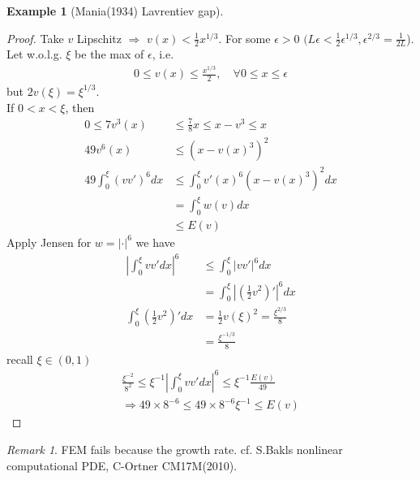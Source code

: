 \documentclass[a4paper,12pt,oneside,fleqn]{book}
\theoremstyle{definition}
\newtheorem*{example}{Example}
\theoremstyle{remark}
\newtheorem*{remark}{Remark}
\begin{document}
\begin{example}[Mania(1934) Lavrentiev gap]
\begin{proof}
	Take $v$ Lipschitz $\Rightarrow$ $v(x) < \frac{1}{2} x^{1\slash 3}$. 
	For some $\epsilon > 0$  $(L\epsilon < \frac{1}{2}\epsilon^{1\slash 3}, \epsilon^{2 \slash 3} = \frac{1}{2L}$). Let w.o.l.g. $\xi$ be the max of $\epsilon$, i.e.
	\begin{align*}
		0 \le v(x) \le \frac{x^{1\slash 3}}{2}, \quad \forall 0 \le x \le \epsilon
	\end{align*}
	but $2v(\xi) = \xi^{1 \slash 3}$. \\
	If $0 < x < \xi$, then 
	\begin{align*}
		0 \le 7 v^3(x) &\le \frac{7}{8} x \le x - v^3 \le x \\
		49 v^6(x) &\le (x - v(x)^3)^2\\
		49 \int_0^\xi (v v')^6 dx &\le \int_0^\xi v'(x)^6 (x - v(x)^3)^2 dx \\
		&= \int_0^\xi w(v)dx \\
		&\le E(v)
	\end{align*}
	Apply Jensen for $w = |\cdot|^6$ we have
	\begin{align*}
		|\int_0^\xi v v'dx|^6 &\le \int_0^\xi |v v'|^6dx\\
		&= \int_0^\xi |(\frac{1}{2} v^2)'|^6dx\\
		\int_0^\xi (\frac{1}{2}v^2)'dx
		&= \frac{1}{2} v(\xi)^2 = \frac{\xi^{2 \slash 3}}{8}\\
		&= \frac{\xi^{-1 \slash 3}}{8}
	\end{align*}
	recall $\xi \in (0, 1)$
	\begin{align*}
		\frac{\xi^{-2}}{8^2} \le \xi^{-1}|\int_0^\xi v v'dx|^6 \le \xi^{-1} \frac{E(v)}{49}\\
		\Rightarrow 49 \times 8^{-6} \le 49 \times 8^{-6} \xi^{-1} \le E(v)
	\end{align*}
	\end{proof}
\end{example}
\begin{remark}
FEM fails because the growth rate. cf. S.Bakls nonlinear computational PDE, 
C-Ortner CM17M(2010).
\end{remark}
\end{document}
